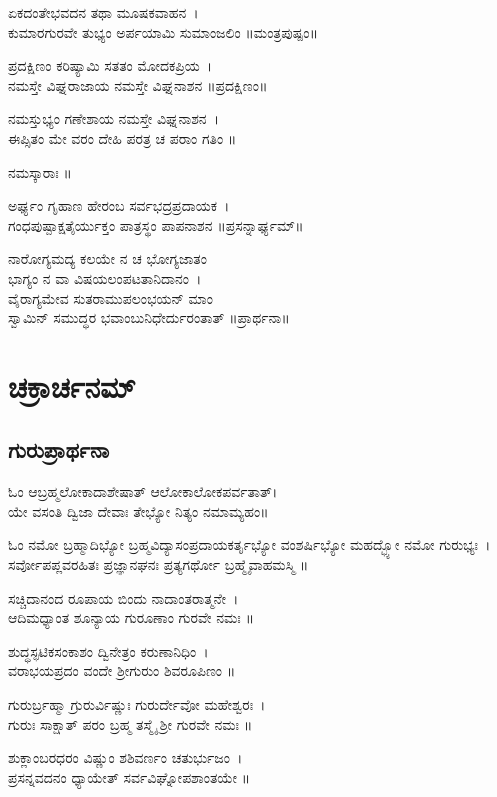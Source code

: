 ಏಕದಂತೇಭವದನ ತಥಾ ಮೂಷಕವಾಹನ~।\\
ಕುಮಾರಗುರವೇ ತುಭ್ಯಂ ಅರ್ಪಯಾಮಿ ಸುಮಾಂಜಲಿಂ ॥ಮಂತ್ರಪುಷ್ಪಂ॥

ಪ್ರದಕ್ಷಿಣಂ ಕರಿಷ್ಯಾಮಿ ಸತತಂ ಮೋದಕಪ್ರಿಯ~।\\
ನಮಸ್ತೇ ವಿಘ್ನರಾಜಾಯ ನಮಸ್ತೇ ವಿಘ್ನನಾಶನ ॥ಪ್ರದಕ್ಷಿಣಂ॥

ನಮಸ್ತುಭ್ಯಂ ಗಣೇಶಾಯ ನಮಸ್ತೇ ವಿಘ್ನನಾಶನ~।\\
ಈಪ್ಸಿತಂ ಮೇ ವರಂ ದೇಹಿ ಪರತ್ರ ಚ ಪರಾಂ ಗತಿಂ ॥

ನಮಸ್ಕಾರಾಃ ॥

ಅರ್ಘ್ಯಂ ಗೃಹಾಣ ಹೇರಂಬ ಸರ್ವಭದ್ರಪ್ರದಾಯಕ~।\\
ಗಂಧಪುಷ್ಪಾಕ್ಷತೈರ್ಯುಕ್ತಂ ಪಾತ್ರಸ್ಥಂ ಪಾಪನಾಶನ ॥ಪ್ರಸನ್ನಾರ್ಘ್ಯಮ್॥

ನಾರೋಗ್ಯಮದ್ಯ ಕಲಯೇ ನ ಚ ಭೋಗ್ಯಜಾತಂ\\
ಭಾಗ್ಯಂ ನ ವಾ ವಿಷಯಲಂಪಟತಾನಿದಾನಂ~।\\
ವೈರಾಗ್ಯಮೇವ ಸುತರಾಮುಪಲಂಭಯನ್ ಮಾಂ\\
ಸ್ವಾಮಿನ್ ಸಮುದ್ಧರ ಭವಾಂಬುನಿಧೇರ್ದುರಂತಾತ್ ॥ಪ್ರಾರ್ಥನಾ॥
\newpage\thispagestyle{empty}

\chapter *{\center ಚಕ್ರಾರ್ಚನಮ್}
\thispagestyle{empty}\section{ಗುರುಪ್ರಾರ್ಥನಾ}
ಓಂ ಆಬ್ರಹ್ಮಲೋಕಾದಾಶೇಷಾತ್ ಆಲೋಕಾಲೋಕಪರ್ವತಾತ್।\\
ಯೇ ವಸಂತಿ ದ್ವಿಜಾ ದೇವಾಃ ತೇಭ್ಯೋ ನಿತ್ಯಂ ನಮಾಮ್ಯಹಂ॥

ಓಂ ನಮೋ ಬ್ರಹ್ಮಾದಿಭ್ಯೋ ಬ್ರಹ್ಮವಿದ್ಯಾಸಂಪ್ರದಾಯಕರ್ತೃಭ್ಯೋ ವಂಶರ್ಷಿಭ್ಯೋ ಮಹದ್ಭ್ಯೋ ನಮೋ ಗುರುಭ್ಯಃ~।\\
ಸರ್ವೋಪಪ್ಲವರಹಿತಃ ಪ್ರಜ್ಞಾನಘನಃ ಪ್ರತ್ಯಗರ್ಥೋ ಬ್ರಹ್ಮೈವಾಹಮಸ್ಮಿ ॥

ಸಚ್ಚಿದಾನಂದ ರೂಪಾಯ ಬಿಂದು ನಾದಾಂತರಾತ್ಮನೇ~।\\
ಆದಿಮಧ್ಯಾಂತ ಶೂನ್ಯಾಯ ಗುರೂಣಾಂ ಗುರವೇ ನಮಃ ॥

ಶುದ್ಧಸ್ಫಟಿಕಸಂಕಾಶಂ ದ್ವಿನೇತ್ರಂ ಕರುಣಾನಿಧಿಂ~।\\
ವರಾಭಯಪ್ರದಂ ವಂದೇ ಶ್ರೀಗುರುಂ ಶಿವರೂಪಿಣಂ ॥

ಗುರುರ್ಬ್ರಹ್ಮಾ ಗ್ರುರುರ್ವಿಷ್ಣುಃ ಗುರುರ್ದೇವೋ ಮಹೇಶ್ವರಃ~।\\
ಗುರುಃ ಸಾಕ್ಷಾತ್ ಪರಂ ಬ್ರಹ್ಮ ತಸ್ಮೈ ಶ್ರೀ ಗುರವೇ ನಮಃ ॥

ಶುಕ್ಲಾಂಬರಧರಂ ವಿಷ್ಣುಂ ಶಶಿವರ್ಣಂ ಚತುರ್ಭುಜಂ~।\\
ಪ್ರಸನ್ನವದನಂ ಧ್ಯಾಯೇತ್ ಸರ್ವವಿಘ್ನೋಪಶಾಂತಯೇ ॥

